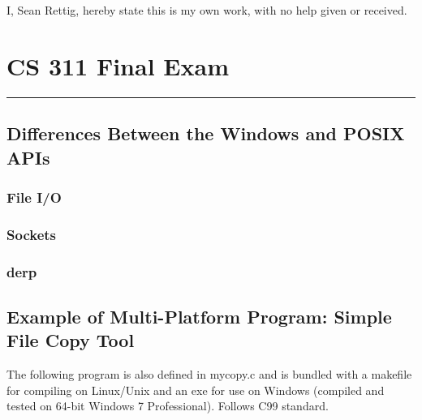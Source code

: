 \documentclass[letterpaper,10pt,fleqn]{article}
\def\name{Sean Rettig}
\numberwithin{equation}{section}
\begin{document}
I, \name, hereby state this is my own work, with no help given or received.


\section*{CS 311 Final Exam}
\hrule

\subsection*{Differences Between the Windows and POSIX APIs}

\subsubsection*{File I/O}

\subsubsection*{Sockets}

\subsubsection*{derp}

\subsection*{Example of Multi-Platform Program: Simple File Copy Tool}

The following program is also defined in mycopy.c and is bundled with a makefile for compiling on Linux/Unix and an exe for use on Windows (compiled and tested on 64-bit Windows 7 Professional).  Follows C99 standard.
\end{document}
